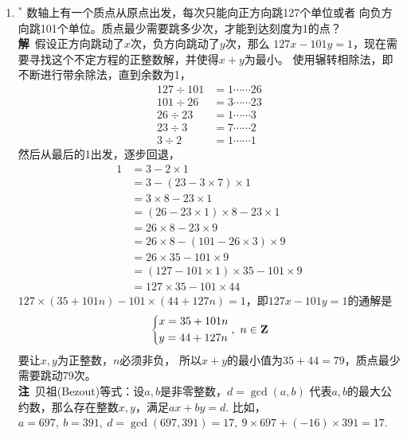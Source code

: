 \begin{enumerate}[label={【\textbf{例\thechapter.\arabic*}】},
 leftmargin=\inteval{\myenumleftmargin}pt,
 itemsep=\inteval{\myenumitempsep}pt,
 itemindent=\inteval{\myenumitemindent}pt]
\item $^*$ 数轴上有一个质点从原点出发，每次只能向正方向跳127个单位或者
向负方向跳101个单位。质点最少需要跳多少次，才能到达刻度为1的点？\\
\textbf{解}\ 假设正方向跳动了$x$次，负方向跳动了$y$次，那么
$ 127x-101y=1 $，现在需要寻找这个不定方程的正整数解，并使得$x+y$为最小。
使用辗转相除法，即不断进行带余除法，直到余数为1，
\begin{align*}
    127\div 101 &=1 \cdots\cdots 26 \\
    101\div  26 &=3 \cdots\cdots 23 \\
    26\div  23 &=1 \cdots\cdots 3 \\
    23\div   3 &=7 \cdots\cdots 2 \\
    3\div   2 &=1 \cdots\cdots 1 
\end{align*}
然后从最后的1出发，逐步回退，
\begin{align*}
    1 &= 3-2\times 1 \\
    &= 3-(23-3\times7)\times 1 \\
    &= 3\times 8-23\times 1\\
    &= (26-23\times1)\times 8-23\times 1\\
    &= 26\times 8-23\times 9 \\
    &= 26\times 8-(101-26\times 3)\times 9  \\
    &= 26\times 35-101\times 9  \\
    &= (127-101\times1)\times 35-101\times 9  \\
    &= 127\times 35-101\times 44
\end{align*}
$ 127\times(35+101n)-101\times(44+127n)=1 $，即$ 127x-101y=1 $的通解是
\begin{gather*}
    \begin{dcases}
        x=35+101n \\
        y=44+127n
    \end{dcases},\ n\in\mathbf{Z}
\end{gather*}
要让$x,y$为正整数，$n$必须非负，
所以$x+y$的最小值为$35+44=79$，质点最少需要跳动79次。\\
\textbf{注}\ 贝祖(Bezout)等式：设$ a,b $是非零整数，$ d=\gcd(a,b) $
代表$ a,b $的最大公约数，那么存在整数$ x,y $，满足$ ax+by=d $. 
比如，$ a=697,\ b=391,\ d=\gcd(697,391)=17,\ 9\times 697+(-16)\times 391=17 $. 


\end{enumerate}

